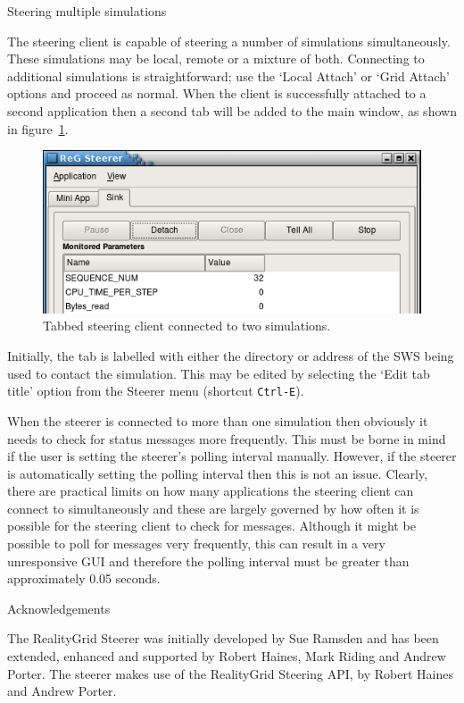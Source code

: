\documentclass[a4paper,twoside]{article}
\begin{document}
\begin{section}{Steering multiple simulations}
\label{sec:multiple_sims}

The steering client is capable of steering a number of simulations
simultaneously.  These simulations may be local, remote or a mixture
of both.  Connecting to additional simulations is straightforward; use
the `Local Attach' or `Grid Attach' options and proceed as normal.
When the client is successfully attached to a second application then
a second tab will be added to the main window, as shown in
figure~\ref{fig:tabbed}.

\begin{figure}
\centerline{\includegraphics{tabbed_steerer.png}}
\caption{Tabbed steering client connected to two simulations.}
\label{fig:tabbed}
\end{figure}

Initially, the tab is labelled with either the directory or address of
the SWS being used to contact the simulation.  This may be edited by
selecting the `Edit tab title' option from the Steerer menu (shortcut
\texttt{Ctrl-E}).

When the steerer is connected to more than one simulation then
obviously it needs to check for status messages more frequently. This
must be borne in mind if the user is setting the steerer's polling
interval manually. However, if the steerer is automatically setting
the polling interval then this is not an issue. Clearly, there are
practical limits on how many applications the steering client can
connect to simultaneously and these are largely governed by how often
it is possible for the steering client to check for messages.
Although it might be possible to poll for messages very frequently,
this can result in a very unresponsive GUI and therefore the polling
interval must be greater than approximately 0.05 seconds.

\end{section} %


\begin{section}{Acknowledgements}

The RealityGrid Steerer was initially developed by Sue Ramsden and has
been extended, enhanced and supported by Robert Haines, Mark Riding
and Andrew Porter. The steerer makes use of the RealityGrid Steering
API, by Robert Haines and Andrew Porter.

\end{section}
\end{document}
